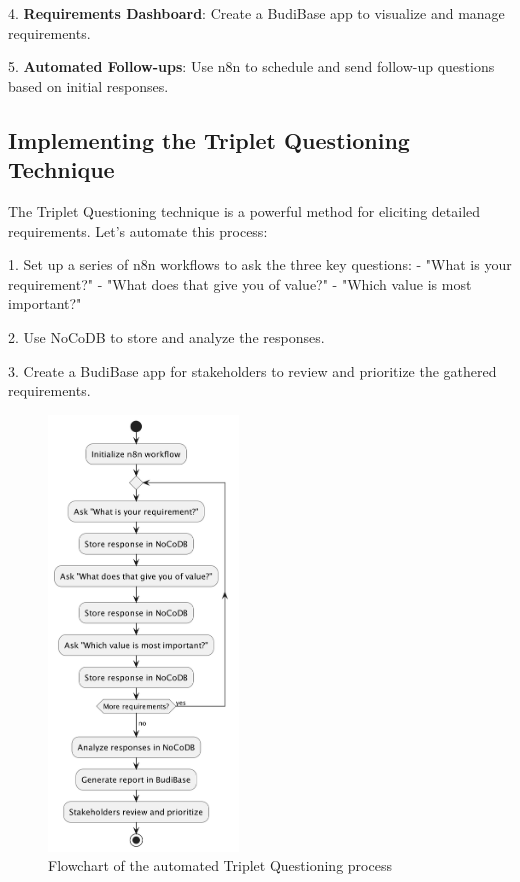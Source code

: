 
4. \textbf{Requirements Dashboard}: Create a BudiBase app to visualize and manage requirements.


5. \textbf{Automated Follow-ups}: Use n8n to schedule and send follow-up questions based on initial responses.


\subsection{Implementing the Triplet Questioning Technique}

The Triplet Questioning technique is a powerful method for eliciting detailed requirements. Let's automate this process:

1. Set up a series of n8n workflows to ask the three key questions:
- "What is your requirement?"
- "What does that give you of value?"
- "Which value is most important?"

2. Use NoCoDB to store and analyze the responses.

3. Create a BudiBase app for stakeholders to review and prioritize the gathered requirements.

\begin{figure}
    \centering
    \includegraphics[width=0.45\textwidth]{./figures/03-flowchart-triplet-questioning.png}
    \caption{Flowchart of the automated Triplet Questioning process}
    \label{fig:triplet-questioning}
\end{figure}
